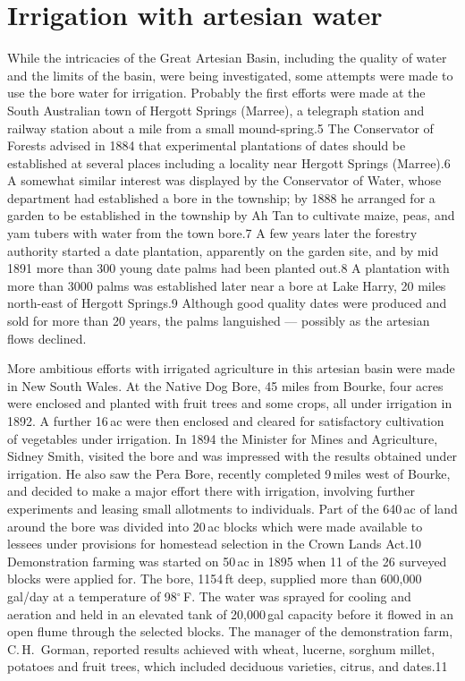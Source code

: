 \section{Irrigation with artesian water}

While the intricacies of the Great Artesian Basin, including the
quality of water and the limits of the basin, were being investigated,
some attempts were made to use the bore water for irrigation.
Probably the first efforts were made at the South Australian town of
Hergott Springs (Marree), a telegraph station and railway station
about a mile from a small mound-spring.5 The Conservator of Forests
advised in 1884 that experimental plantations of dates should be
established at several places including a locality near Hergott
Springs (Marree).6 A somewhat similar interest was displayed by the
Conservator of Water, whose department had established a bore in the
township; by 1888 he arranged for a garden to be established in the
township by Ah Tan to cultivate maize, peas, and yam tubers with water
from the town bore.7 A few years later the forestry authority started
a date plantation, apparently on the garden site, and by mid 1891 more
than 300 young date palms had been planted out.8 A plantation with
more than 3000 palms was established later near a bore at Lake Harry,
20 miles north-east of Hergott Springs.9 Although good quality dates
were produced and sold for more than 20 years, the palms languished
--- possibly as the artesian flows declined.

More ambitious efforts with irrigated agriculture in this artesian
basin were made in New South Wales.  At the Native Dog Bore, 45 miles
from Bourke, four acres were enclosed and planted with fruit trees and
some crops, all under irrigation in 1892.  A further 16\,ac were then
enclosed and cleared for satisfactory cultivation of vegetables under
irrigation.  In 1894 the Minister for Mines and Agriculture, Sidney
Smith, visited the bore and was impressed with the results obtained
under irrigation.  He also saw the Pera Bore, recently completed
9\,miles west of Bourke, and decided to make a major effort there with
irrigation, involving further experiments and leasing small allotments
to individuals.  Part of the 640\,ac of land around the bore was
divided into 20\,ac blocks which were made available to lessees under
provisions for homestead selection in the Crown Lands Act.10
Demonstration farming was started on 50\,ac in 1895 when 11 of the 26
surveyed blocks were applied for. The bore, 1154\,ft deep, supplied
more than 600,000\,gal/day at a temperature of 98$^\circ$\,F.  The
water was sprayed for cooling and aeration and held in an elevated
tank of 20,000\,gal capacity before it flowed in an open flume through
the selected blocks.  The manager of the demonstration farm,
C.\,H.~Gorman, reported results achieved with wheat, lucerne, sorghum
millet, potatoes and fruit trees, which included deciduous varieties,
citrus, and dates.11

